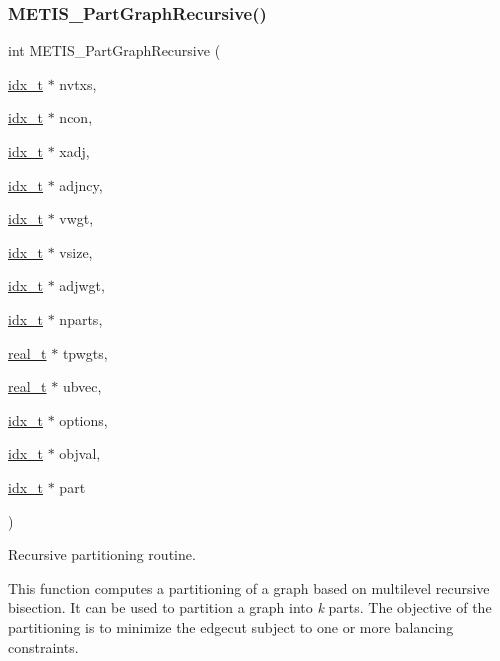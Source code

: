 \subsubsection{\texorpdfstring{M\+E\+T\+I\+S\+\_\+\+Part\+Graph\+Recursive()}{METIS\_PartGraphRecursive()}}
{\footnotesize\ttfamily int M\+E\+T\+I\+S\+\_\+\+Part\+Graph\+Recursive (\begin{DoxyParamCaption}\item[{\hyperlink{a00876_aaa5262be3e700770163401acb0150f52}{idx\+\_\+t} $\ast$}]{nvtxs,  }\item[{\hyperlink{a00876_aaa5262be3e700770163401acb0150f52}{idx\+\_\+t} $\ast$}]{ncon,  }\item[{\hyperlink{a00876_aaa5262be3e700770163401acb0150f52}{idx\+\_\+t} $\ast$}]{xadj,  }\item[{\hyperlink{a00876_aaa5262be3e700770163401acb0150f52}{idx\+\_\+t} $\ast$}]{adjncy,  }\item[{\hyperlink{a00876_aaa5262be3e700770163401acb0150f52}{idx\+\_\+t} $\ast$}]{vwgt,  }\item[{\hyperlink{a00876_aaa5262be3e700770163401acb0150f52}{idx\+\_\+t} $\ast$}]{vsize,  }\item[{\hyperlink{a00876_aaa5262be3e700770163401acb0150f52}{idx\+\_\+t} $\ast$}]{adjwgt,  }\item[{\hyperlink{a00876_aaa5262be3e700770163401acb0150f52}{idx\+\_\+t} $\ast$}]{nparts,  }\item[{\hyperlink{a00876_a1924a4f6907cc3833213aba1f07fcbe9}{real\+\_\+t} $\ast$}]{tpwgts,  }\item[{\hyperlink{a00876_a1924a4f6907cc3833213aba1f07fcbe9}{real\+\_\+t} $\ast$}]{ubvec,  }\item[{\hyperlink{a00876_aaa5262be3e700770163401acb0150f52}{idx\+\_\+t} $\ast$}]{options,  }\item[{\hyperlink{a00876_aaa5262be3e700770163401acb0150f52}{idx\+\_\+t} $\ast$}]{objval,  }\item[{\hyperlink{a00876_aaa5262be3e700770163401acb0150f52}{idx\+\_\+t} $\ast$}]{part }\end{DoxyParamCaption})}



Recursive partitioning routine. 

This function computes a partitioning of a graph based on multilevel recursive bisection. It can be used to partition a graph into {\itshape k} parts. The objective of the partitioning is to minimize the edgecut subject to one or more balancing constraints.


